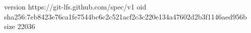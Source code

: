version https://git-lfs.github.com/spec/v1
oid sha256:7eb8423e76ca1fe7544bc6c2c521acf2c3c220e134a47602d2b3f1146aed956b
size 22036
